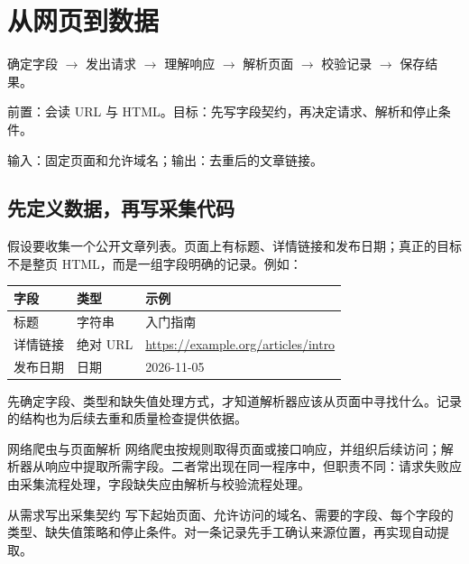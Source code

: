 \chapter{从网页到数据}\label{ch:workflow}
\begin{tcolorbox}[title=章首知识地图,colframe=Ink]
确定字段 $\longrightarrow$ 发出请求 $\longrightarrow$ 理解响应 $\longrightarrow$ 解析页面 $\longrightarrow$ 校验记录 $\longrightarrow$ 保存结果。
\end{tcolorbox}

\begin{tcolorbox}[title=学习目标与前置知识,colframe=Ink!65,colback=Ink!2]
前置：会读 URL 与 HTML。目标：先写字段契约，再决定请求、解析和停止条件。\par
输入：固定页面和允许域名；输出：去重后的文章链接。
\end{tcolorbox}

\section{先定义数据，再写采集代码}\label{sec:workflow:target}
假设要收集一个公开文章列表。页面上有标题、详情链接和发布日期；真正的目标不是整页 HTML，而是一组字段明确的记录。例如：
\begin{center}
\begin{tabular}{@{}lll@{}}
\toprule
字段 & 类型 & 示例\\
\midrule
标题 & 字符串 & 入门指南\\
详情链接 & 绝对 URL & \url{https://example.org/articles/intro}\\
发布日期 & 日期 & 2026-11-05\\
\bottomrule
\end{tabular}
\end{center}

先确定字段、类型和缺失值处理方式，才知道解析器应该从页面中寻找什么。记录的结构也为后续去重和质量检查提供依据。

\begin{definition}{网络爬虫与页面解析}
网络爬虫按规则取得页面或接口响应，并组织后续访问；解析器从响应中提取所需字段。二者常出现在同一程序中，但职责不同：请求失败应由采集流程处理，字段缺失应由解析与校验流程处理。
\end{definition}

\begin{method}{从需求写出采集契约}
写下起始页面、允许访问的域名、需要的字段、每个字段的类型、缺失值策略和停止条件。对一条记录先手工确认来源位置，再实现自动提取。
\end{method}

